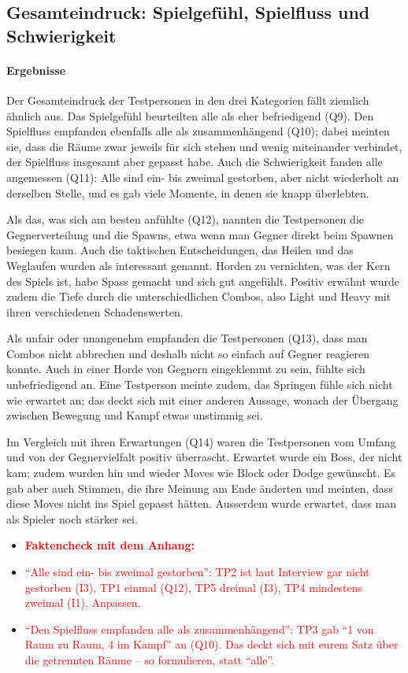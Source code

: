 \documentclass[../Main.tex]{subfiles}
\begin{document}
\subsection{Gesamteindruck: Spielgefühl, Spielfluss und Schwierigkeit} \label{sec:Gesamteindruck} \label{sec:ErgAllgemein}

\paragraph{Ergebnisse}
Der Gesamteindruck der Testpersonen in den drei Kategorien fällt ziemlich ähnlich aus. Das Spielgefühl beurteilten alle als eher befriedigend (Q9). Den Spielfluss empfanden ebenfalls alle als zusammenhängend (Q10); dabei meinten sie, dass die Räume zwar jeweils für sich stehen und wenig miteinander verbindet, der Spielfluss insgesamt aber gepasst habe. Auch die Schwierigkeit fanden alle angemessen (Q11): Alle sind ein- bis zweimal gestorben, aber nicht wiederholt an derselben Stelle, und es gab viele Momente, in denen sie knapp überlebten.

Als das, was sich am besten anfühlte (Q12), nannten die Testpersonen die Gegnerverteilung und die Spawns, etwa wenn man Gegner direkt beim Spawnen besiegen kann. Auch die taktischen Entscheidungen, das Heilen und das Weglaufen wurden als interessant genannt. Horden zu vernichten, was der Kern des Spiels ist, habe Spass gemacht und sich gut angefühlt. Positiv erwähnt wurde zudem die Tiefe durch die unterschiedlichen Combos, also Light und Heavy mit ihren verschiedenen Schadenswerten.

Als unfair oder unangenehm empfanden die Testpersonen (Q13), dass man Combos nicht abbrechen und deshalb nicht so einfach auf Gegner reagieren konnte. Auch in einer Horde von Gegnern eingeklemmt zu sein, fühlte sich unbefriedigend an. Eine Testperson meinte zudem, das Springen fühle sich nicht wie erwartet an; das deckt sich mit einer anderen Aussage, wonach der Übergang zwischen Bewegung und Kampf etwas unstimmig sei.

Im Vergleich mit ihren Erwartungen (Q14) waren die Testpersonen vom Umfang und von der Gegnervielfalt positiv überrascht. Erwartet wurde ein Boss, der nicht kam; zudem wurden hin und wieder Moves wie Block oder Dodge gewünscht. Es gab aber auch Stimmen, die ihre Meinung am Ende änderten und meinten, dass diese Moves nicht ins Spiel gepasst hätten. Ausserdem wurde erwartet, dass man als Spieler noch stärker sei.

\begin{itemize}[leftmargin=1.5cm]
    \item \textcolor{red}{\textbf{Faktencheck mit dem Anhang:}}
    \item \textcolor{red}{\enquote{Alle sind ein- bis zweimal gestorben}: TP2 ist laut Interview gar nicht gestorben (I3), TP1 einmal (Q12), TP5 dreimal (I3), TP4 mindestens zweimal (I1). Anpassen.}
    \item \textcolor{red}{\enquote{Den Spielfluss empfanden alle als zusammenhängend}: TP3 gab \enquote{1 von Raum zu Raum, 4 im Kampf} an (Q10). Das deckt sich mit eurem Satz über die getrennten Räume -- so formulieren, statt \enquote{alle}.}
\end{itemize}
\end{document}
